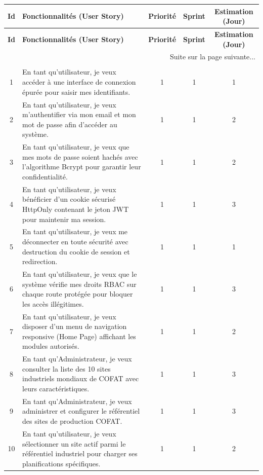 \begin{longtable}{|c|p{8.8cm}|c|c|c|}
\hline
\textbf{Id} & \textbf{Fonctionnalités (User Story)} & \textbf{Priorité} & \textbf{Sprint} & \textbf{Estimation (Jour)} \\ \hline
\endfirsthead
\hline
\textbf{Id} & \textbf{Fonctionnalités (User Story)} & \textbf{Priorité} & \textbf{Sprint} & \textbf{Estimation (Jour)} \\ \hline
\endhead
\hline \multicolumn{5}{|r|}{{Suite sur la page suivante...}} \\ \hline
\endfoot
\hline
\endlastfoot
\multicolumn{5}{|c|}{\textbf{Sprint 1 : Socle technique, authentification et administration des sites (25 jours)}} \\ \hline
1 & En tant qu'utilisateur, je veux accéder à une interface de connexion épurée pour saisir mes identifiants. & 1 & 1 & 1 \\ \hline
2 & En tant qu'utilisateur, je veux m'authentifier via mon email et mon mot de passe afin d'accéder au système. & 1 & 1 & 2 \\ \hline
3 & En tant qu'utilisateur, je veux que mes mots de passe soient hachés avec l'algorithme Bcrypt pour garantir leur confidentialité. & 1 & 1 & 2 \\ \hline
4 & En tant qu'utilisateur, je veux bénéficier d'un cookie sécurisé HttpOnly contenant le jeton JWT pour maintenir ma session. & 1 & 1 & 3 \\ \hline
5 & En tant qu'utilisateur, je veux me déconnecter en toute sécurité avec destruction du cookie de session et redirection. & 1 & 1 & 1 \\ \hline
6 & En tant qu'utilisateur, je veux que le système vérifie mes droits RBAC sur chaque route protégée pour bloquer les accès illégitimes. & 1 & 1 & 3 \\ \hline
7 & En tant qu'utilisateur, je veux disposer d'un menu de navigation responsive (Home Page) affichant les modules autorisés. & 1 & 1 & 2 \\ \hline
8 & En tant qu'Administrateur, je veux consulter la liste des 10 sites industriels mondiaux de COFAT avec leurs caractéristiques. & 1 & 1 & 3 \\ \hline
9 & En tant qu'Administrateur, je veux administrer et configurer le référentiel des sites de production COFAT. & 1 & 1 & 3 \\ \hline
10 & En tant qu'utilisateur, je veux sélectionner un site actif parmi le référentiel industriel pour charger ses planifications spécifiques. & 1 & 1 & 2 \\ \hline

\end{longtable}
